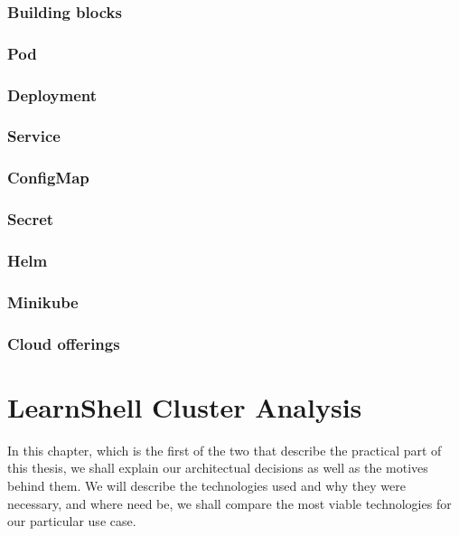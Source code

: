 \documentclass[thesis=B,english]{FITthesis}[2019/12/23]
\begin{document}
\subsection{Building blocks}

\subsection{Pod}

\subsection{Deployment}

\subsection{Service}

\subsection{ConfigMap}

\subsection{Secret}

\subsection{Helm}

\subsection{Minikube}

\subsection{Cloud offerings}



\chapter{LearnShell Cluster Analysis}

In this chapter, which is the first of the two that describe the practical part of this thesis, we shall explain our architectual decisions as well as the motives behind them. We will describe the technologies used and why they were necessary, and where need be, we shall compare the most viable technologies for our particular use case.
\end{document}
